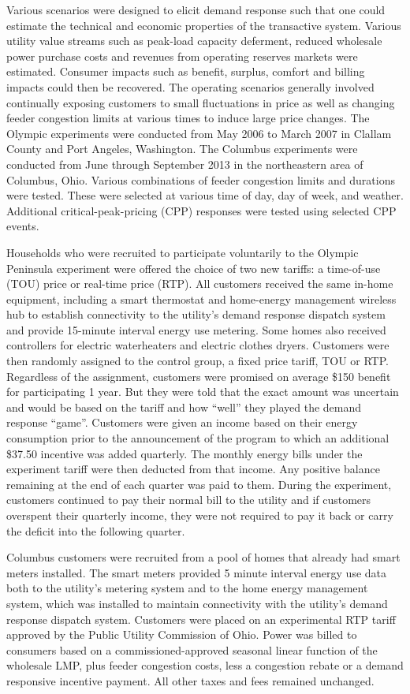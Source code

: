Various scenarios were designed to elicit demand response such that one could estimate the technical and economic properties of the transactive system. Various utility value streams such as peak-load capacity deferment, reduced wholesale power purchase costs and revenues from operating reserves markets were estimated. Consumer impacts such as benefit, surplus, comfort and billing impacts could then be recovered. The operating scenarios generally involved continually exposing customers to small fluctuations in price as well as changing feeder congestion limits at various times to induce large price changes.  The Olympic experiments were conducted from May 2006 to March 2007 in Clallam County and Port Angeles, Washington.  The Columbus experiments were conducted from June through September 2013 in the northeastern area of Columbus, Ohio. Various combinations of feeder congestion limits and durations were tested. These were selected at various time of day, day of week, and weather.  Additional critical-peak-pricing (CPP) responses were tested using selected CPP events. 

Households who were recruited to participate voluntarily to the Olympic Peninsula experiment were offered the choice of two new tariffs: a time-of-use (TOU) price or real-time price (RTP).  All customers received the same in-home equipment, including a smart thermostat and home-energy management wireless hub to establish connectivity to the utility's demand response dispatch system and provide 15-minute interval energy use metering. Some homes also received controllers for electric waterheaters and electric clothes dryers. Customers were then randomly assigned to the control group, a fixed price tariff, TOU or RTP. Regardless of the assignment, customers were promised on average \$150 benefit for participating 1 year. But they were told that the exact amount was uncertain and would be based on the tariff and how ``well'' they played the demand response ``game''. Customers were given an income based on their energy consumption prior to the announcement of the program to which an additional \$37.50 incentive was added quarterly. The monthly energy bills under the experiment tariff were then deducted from that income.  Any positive balance remaining at the end of each quarter was paid to them. During the experiment, customers continued to pay their normal bill to the utility and if customers overspent their quarterly income, they were not required to pay it back or carry the deficit into the following quarter. 

Columbus customers were recruited from a pool of homes that already had smart meters installed.  The smart meters provided 5 minute interval energy use data both to the utility's metering system and to the home energy management system, which was installed to maintain connectivity with the utility's demand response dispatch system. Customers were placed on an experimental RTP tariff approved by the Public Utility Commission of Ohio. Power was billed to consumers based on a commissioned-approved seasonal linear function of the wholesale LMP, plus feeder congestion costs, less a congestion rebate or a demand responsive incentive payment.  All other taxes and fees remained unchanged. 

